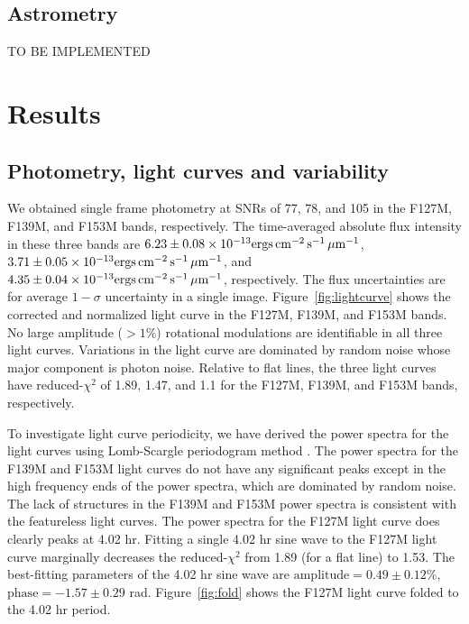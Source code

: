 \documentclass[twocolumn]{aastex62}
\begin{document}
\subsection{Astrometry}
TO BE IMPLEMENTED

\section{Results}
\subsection{Photometry, light curves and variability}

\newcommand{\fluxunit}{\ensuremath{\mathrm{ergs}\,\mathrm{cm^{-2}}\,\mathrm{s^{-1}}\,\mathrm{\micron^{{-1}}}}}
We obtained single frame photometry at SNRs of 77, 78, and 105 in the F127M, F139M, and F153M bands, respectively. The time-averaged absolute flux intensity in these three bands are $6.23\pm0.08\times10^{-13}\fluxunit$, $3.71\pm0.05\times10^{-13}\fluxunit$, and $4.35\pm0.04\times10^{{-13}}\fluxunit$, respectively. The flux uncertainties are for average $1-\sigma$ uncertainty in a single image. Figure~\ref{fig:lightcurve} shows the corrected and normalized light curve in the F127M, F139M, and F153M bands.  No large amplitude ($>1\%$) rotational modulations are identifiable in all three light curves. Variations in the light curve are dominated by random noise whose major component is photon noise. Relative to flat lines, the three light curves have reduced-$\chi^{2}$ of 1.89, 1.47, and 1.1 for the F127M, F139M, and F153M bands, respectively.

To investigate light curve periodicity, we have derived the power spectra for the light curves using Lomb-Scargle periodogram method \citep[][Figure~\ref{fig:periodogram}]{Lomb1976}. The power spectra for the F139M and F153M light curves do not have any significant peaks except in the high frequency ends of the power spectra, which are dominated by random noise. The lack of structures in the F139M and F153M power spectra is consistent with the featureless light curves. The power spectra for the F127M light curve does clearly peaks at 4.02 hr. Fitting a single 4.02 hr sine wave to the F127M light curve marginally decreases the reduced-$\chi^{2}$ from 1.89 (for a flat line) to 1.53. The best-fitting parameters of the 4.02 hr sine wave are $\mathrm{amplitude}=0.49\pm0.12\%$, $\mathrm{phase} = -1.57\pm0.29$ rad. Figure~\ref{fig:fold} shows the F127M light curve folded to the 4.02 hr period.
\end{document}
